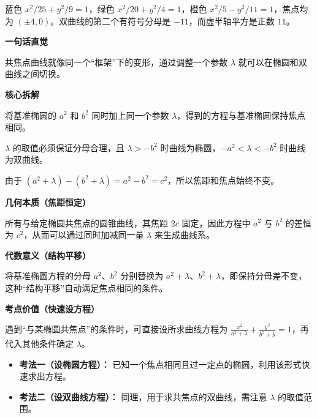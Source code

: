 \begin{explanationbox}
\begin{minipage}{\linewidth}
\begin{center}\end{center}
蓝色 $x^2/25+y^2/9=1$，绿色 $x^2/20+y^2/4=1$，橙色 $x^2/5-y^2/11=1$，焦点均为 $(\pm4,0)$。双曲线的第二个有符号分母是 $-11$，而虚半轴平方是正数 $11$。
\end{minipage}
\par\medskip


	\textbf{\textcolor{CExplanation}{一句话直觉}}

	共焦点曲线就像同一个“框架”下的变形，通过调整一个参数 $\lambda$ 就可以在椭圆和双曲线之间切换。

	\medskip
	\textbf{\textcolor{CExplanation}{核心拆解}}
	\begin{description}[style=nextline, leftmargin=2.8em, labelsep=0.5em, itemsep=0.45em]
		\item[\textbf{要点一（统一形式）：}] 将基准椭圆的 $a^2$ 和 $b^2$ 同时加上同一个参数 $\lambda$，得到的方程与基准椭圆保持焦点相同。
		\item[\textbf{要点二（参数范围）：}] $\lambda$ 的取值必须保证分母合理，且 $\lambda>-b^2$ 时曲线为椭圆，$-a^2<\lambda<-b^2$ 时曲线为双曲线。
		\item[\textbf{要点三（焦点不变）：}] 由于 $(a^2+\lambda)-(b^2+\lambda)=a^2-b^2=c^2$，所以焦距和焦点始终不变。
	\end{description}

	\medskip
	\textbf{\textcolor{CExplanation}{几何本质（焦距恒定）}}

	所有与给定椭圆共焦点的圆锥曲线，其焦距 $2c$ 固定，因此方程中 $a^2$ 与 $b^2$ 的差恒为 $c^2$，从而可以通过同时加减同一量 $\lambda$ 来生成曲线系。

	\medskip
	\textbf{\textcolor{CExplanation}{代数意义（结构平移）}}

	将基准椭圆方程的分母 $a^2$、$b^2$ 分别替换为 $a^2+\lambda$、$b^2+\lambda$，即保持分母差不变，这种“结构平移”自动满足焦点相同的条件。

	\medskip
	\textbf{\textcolor{CExplanation}{考点价值（快速设方程）}}

	遇到“与某椭圆共焦点”的条件时，可直接设所求曲线方程为 $\frac{x^2}{a^2+\lambda}+\frac{y^2}{b^2+\lambda}=1$，再代入其他条件确定 $\lambda$。
	\begin{itemize}[leftmargin=*, itemsep=0.5em, topsep=0.4em]
		\item \textbf{考法一（设椭圆方程）：} 已知一个焦点相同且过一定点的椭圆，利用该形式快速求出方程。
		\item \textbf{考法二（设双曲线方程）：} 同理，用于求共焦点的双曲线，需注意 $\lambda$ 的取值范围。
	\end{itemize}


\end{explanationbox}
